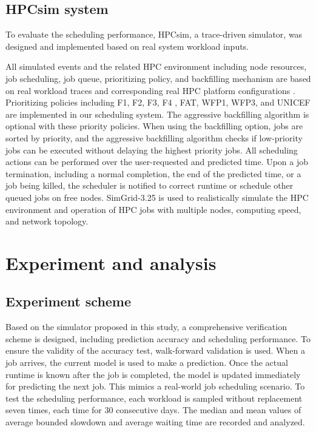 \documentclass[a4paper,fleqn]{cas-sc}
\begin{document}
\subsection{HPCsim system}
To evaluate the scheduling performance, HPCsim, a trace-driven simulator, was designed and implemented based on real system workload inputs.

All simulated events and the related HPC environment including node resources, job scheduling, job queue, prioritizing policy, and backfilling mechanism are based on real workload traces and corresponding real HPC platform configurations \cite{10JPDC}. Prioritizing policies including F1, F2, F3, F4 \cite{4SC17}, FAT, WFP1, WFP3, and UNICEF \cite{5Cluster09} are implemented in our scheduling system. The aggressive backfilling algorithm is optional with these priority policies. When using the backfilling option, jobs are sorted by priority, and the aggressive backfilling algorithm checks if low-priority jobs can be executed without delaying the highest priority jobs. All scheduling actions can be performed over the user-requested and predicted time. Upon a job termination, including a normal completion, the end of the predicted time, or a job being killed, the scheduler is notified to correct runtime or  schedule other queued jobs on free nodes. SimGrid-3.25 \cite{21JPDC} is used to realistically simulate the HPC environment and operation of HPC jobs with multiple nodes, computing speed, and network topology.

\section{Experiment and analysis} \label{sect4}
\subsection{Experiment scheme}
Based on the simulator proposed in this study, a comprehensive verification scheme is designed, including prediction accuracy and scheduling performance. To ensure the validity of the accuracy test, walk-forward validation is used. When a job arrives, the current model is used to make a prediction. Once the actual runtime is known after the job is completed, the model is updated immediately for predicting the next job. This mimics a real-world job scheduling scenario. To test the scheduling performance, each workload is sampled without replacement seven times, each time for 30 consecutive days. The median and mean values of average bounded slowdown and average waiting time are recorded and analyzed.
\end{document}
